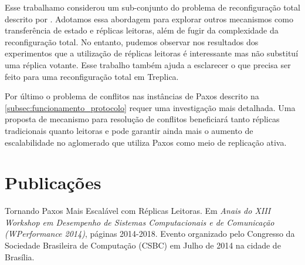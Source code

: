 Esse trabalhamo considerou um sub-conjunto do problema de reconfiguração total descrito
por . Adotamos essa abordagem para explorar outros mecanismos como
transferência de estado e réplicas leitoras, além de fugir da complexidade da
reconfiguração total. No entanto, pudemos observar nos resultados dos experimentos que a
utilização de réplicas leitoras é interessante mas não substituí uma réplica votante. Esse
trabalho também ajuda a esclarecer o que precisa ser feito para uma reconfiguração total
em Treplica.

Por último o problema de conflitos nas instâncias de Paxos descrito na
\autoref{subsec:funcionamento_protocolo} requer uma investigação mais detalhada. Uma
proposta de mecanismo para resolução de conflitos beneficiará tanto réplicas tradicionais
quanto leitoras e pode garantir ainda mais o aumento de escalabilidade no aglomerado que
utiliza Paxos como meio de replicação ativa.


\section*{Publicações}

Tornando Paxos Mais Escalável com Réplicas Leitoras. Em \emph{Anais do XIII Workshop em
Desempenho de Sistemas Computacionais e de Comunicação (WPerformance 2014)}, páginas
2014-2018. Evento organizado pelo Congresso da Sociedade Brasileira de Computação (CSBC)
em Julho de 2014 na cidade de Brasília.

